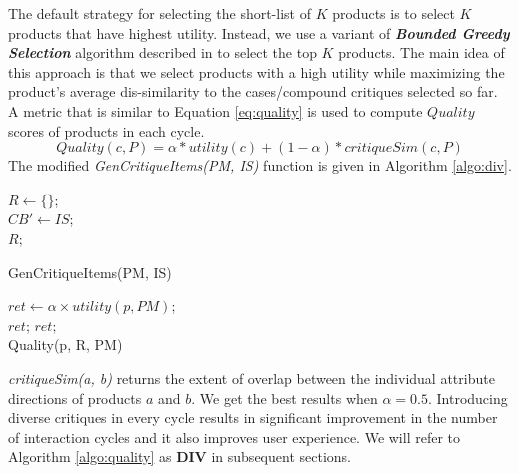 The default strategy for selecting the short-list of $K$ products is to select $K$ products that have highest utility.
Instead, we use a variant of \textit{\textbf{Bounded Greedy Selection}} algorithm described in \cite{boundedGreedy} to select the top $K$ products.
The main idea of this approach is that we select products with a high utility while maximizing the product's average dis-similarity to the cases/compound critiques selected so far.
A metric that is similar to Equation \ref{eq:quality} is used to compute $Quality$ scores of products in each cycle.
\begin{equation}
\label{eq:quality}
Quality(c, P) = \alpha * utility(c) + (1-\alpha)*critiqueSim(c, P)
\end{equation}
%
The modified \textit{GenCritiqueItems(PM, IS)} function is given in Algorithm \ref{algo:div}.
\begin{algorithm}[ht]
  \DontPrintSemicolon

  $R \gets \{\}$;\\
  $CB' \gets IS$;\\
  \Return $R;$
  \caption{GenCritiqueItems(PM, IS)}
  \label{algo:div}
\end{algorithm}

\begin{algorithm}[ht]
  \DontPrintSemicolon

  $ret \gets \alpha \times utility(p, PM)$; \\
   {\Return $ret$;}
  \Return $ret;$\\
  \caption{Quality(p, R, PM)}
  \label{algo:quality}
\end{algorithm}

\textit{critiqueSim(a, b)} returns the extent of overlap between the individual attribute directions of products $a$ and $b$.
We get the best results when $\alpha = 0.5$.
Introducing diverse critiques in every cycle results in significant improvement in the number of interaction cycles and it also improves user experience.
We will refer to Algorithm \ref{algo:quality} as \textbf{DIV} in subsequent sections.



